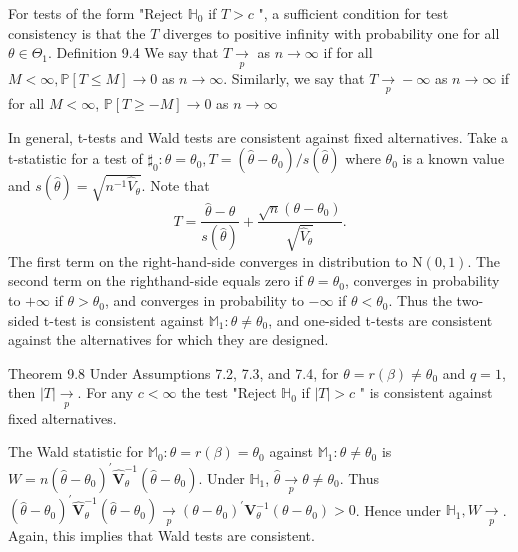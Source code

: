 \documentclass[10pt]{article}
\begin{document}
For tests of the form "Reject $\mathbb{H}_{0}$ if $T>c$ ", a sufficient condition for test consistency is that the $T$ diverges to positive infinity with probability one for all $\theta \in \Theta_{1}$. Definition 9.4 We say that $T \underset{p}{\rightarrow}$ as $n \rightarrow \infty$ if for all $M<\infty, \mathbb{P}[T \leq M] \rightarrow 0$ as $n \rightarrow \infty$. Similarly, we say that $T \underset{p}{\rightarrow}-\infty$ as $n \rightarrow \infty$ if for all $M<\infty$, $\mathbb{P}[T \geq-M] \rightarrow 0$ as $n \rightarrow \infty$

In general, t-tests and Wald tests are consistent against fixed alternatives. Take a t-statistic for a test of $\mathbb{\sharp}_{0}: \theta=\theta_{0}, T=\left(\widehat{\theta}-\theta_{0}\right) / s(\widehat{\theta})$ where $\theta_{0}$ is a known value and $s(\widehat{\theta})=\sqrt{n^{-1} \widehat{V}_{\theta}}$. Note that
$$
T=\frac{\widehat{\theta}-\theta}{s(\widehat{\theta})}+\frac{\sqrt{n}\left(\theta-\theta_{0}\right)}{\sqrt{\widehat{V}_{\theta}}} .
$$
The first term on the right-hand-side converges in distribution to $\mathrm{N}(0,1)$. The second term on the righthand-side equals zero if $\theta=\theta_{0}$, converges in probability to $+\infty$ if $\theta>\theta_{0}$, and converges in probability to $-\infty$ if $\theta<\theta_{0}$. Thus the two-sided t-test is consistent against $\mathbb{M}_{1}: \theta \neq \theta_{0}$, and one-sided t-tests are consistent against the alternatives for which they are designed.

Theorem 9.8 Under Assumptions 7.2, 7.3, and 7.4, for $\theta=r(\beta) \neq \theta_{0}$ and $q=1$, then $|T| \underset{p}{\longrightarrow}$. For any $c<\infty$ the test "Reject $\mathbb{H}_{0}$ if $|T|>c$ " is consistent against fixed alternatives.

The Wald statistic for $\mathbb{M}_{0}: \theta=r(\beta)=\theta_{0}$ against $\mathbb{M}_{1}: \theta \neq \theta_{0}$ is $W=n\left(\widehat{\theta}-\theta_{0}\right)^{\prime} \widehat{\boldsymbol{V}}_{\theta}^{-1}\left(\widehat{\theta}-\theta_{0}\right)$. Under $\mathbb{H}_{1}$, $\widehat{\theta} \underset{p}{\longrightarrow} \theta \neq \theta_{0}$. Thus $\left(\widehat{\theta}-\theta_{0}\right)^{\prime} \widehat{\boldsymbol{V}}_{\theta}^{-1}\left(\widehat{\theta}-\theta_{0}\right) \underset{p}{\longrightarrow}\left(\theta-\theta_{0}\right)^{\prime} \boldsymbol{V}_{\theta}^{-1}\left(\theta-\theta_{0}\right)>0$. Hence under $\mathbb{H}_{1}, W \underset{p}{\longrightarrow}$. Again, this implies that Wald tests are consistent.
\end{document}
